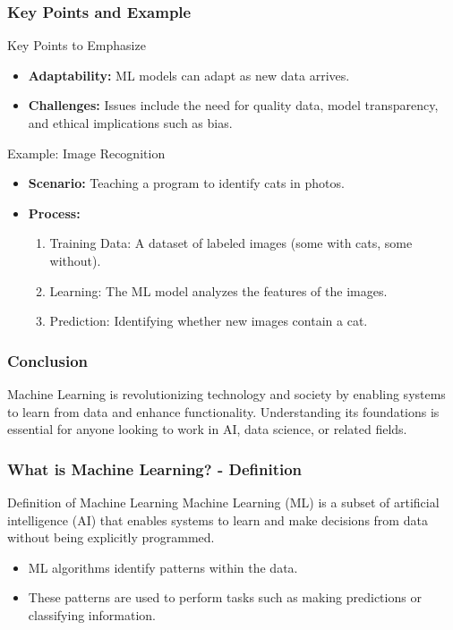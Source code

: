 \documentclass[aspectratio=169]{beamer}
\begin{document}
\begin{frame}[fragile]
    \frametitle{Key Points and Example}
    \begin{block}{Key Points to Emphasize}
        \begin{itemize}
            \item \textbf{Adaptability:} ML models can adapt as new data arrives.
            \item \textbf{Challenges:} Issues include the need for quality data, model transparency, and ethical implications such as bias.
        \end{itemize}
    \end{block}
    
    \begin{block}{Example: Image Recognition}
        \begin{itemize}
            \item \textbf{Scenario:} Teaching a program to identify cats in photos.
            \item \textbf{Process:}
            \begin{enumerate}
                \item Training Data: A dataset of labeled images (some with cats, some without).
                \item Learning: The ML model analyzes the features of the images.
                \item Prediction: Identifying whether new images contain a cat.
            \end{enumerate}
        \end{itemize}
    \end{block}
\end{frame}

\begin{frame}[fragile]
    \frametitle{Conclusion}
    Machine Learning is revolutionizing technology and society by enabling systems to learn from data and enhance functionality. Understanding its foundations is essential for anyone looking to work in AI, data science, or related fields.
\end{frame}

\begin{frame}[fragile]
    \frametitle{What is Machine Learning? - Definition}
    \begin{block}{Definition of Machine Learning}
        Machine Learning (ML) is a subset of artificial intelligence (AI) that enables systems to learn and make decisions from data without being explicitly programmed.
    \end{block}
    \begin{itemize}
        \item ML algorithms identify patterns within the data.
        \item These patterns are used to perform tasks such as making predictions or classifying information.
    \end{itemize}
\end{frame}
\end{document}
